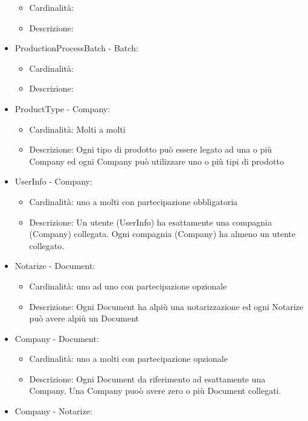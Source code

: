 \documentclass[a4paper,11pt]{article}
\begin{document}
\begin{itemize}
        \begin{itemize}
          \item Cardinalità:
          \item Descrizione:
        \end{itemize}
  \item ProductionProcessBatch - Batch:
        \begin{itemize}
          \item Cardinalità:
          \item Descrizione:
        \end{itemize}
  \item ProductType - Company:
        \begin{itemize}
          \item Cardinalità: Molti a molti
          \item Descrizione: Ogni tipo di prodotto può essere legato ad una o più Company ed ogni Company può utilizzare uno o più tipi di prodotto
        \end{itemize}
  \item UserInfo - Company:
        \begin{itemize}
          \item Cardinalità: uno a molti con partecipazione obbligatoria
          \item Descrizione: Un utente (UserInfo) ha esattamente una compagnia (Company) collegata. Ogni compagnia (Company) ha almeno un utente collegato.
        \end{itemize}
  \item Notarize - Document:
        \begin{itemize}
          \item Cardinalità: uno ad uno con partecipazione opzionale
          \item Descrizione: Ogni Document ha alpiù una notarizzazione ed ogni Notarize può avere alpiù un Document
        \end{itemize}
  \item Company - Document:
        \begin{itemize}
          \item Cardinalità: uno a molti con partecipazione opzionale
          \item Descrizione: Ogni Document da riferimento ad esattamente una Company. Una Company puoò avere zero o più Document collegati.
        \end{itemize}
  \item Company - Notarize:
        \begin{itemize}

\end{itemize}
\end{itemize}
\end{document}

